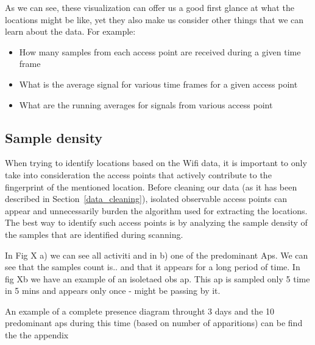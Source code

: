As we can see, these visualization can offer us a good first glance at what the
locations might be like, yet they also make us consider other things that we can
learn about the data. For example:
\begin{itemize}
  \item How many samples from each access point are received during a given time
  frame
  \item What is the average signal for various time frames for a given access
  point
  \item What are the running averages for signals from various access point
\end{itemize}

\subsection{Sample density}

When trying to identify locations based on the Wifi data, it is important to
only take into consideration the access points that actively contribute to the
fingerprint of the mentioned location. Before cleaning our data (as it has been
described in Section~\ref{data_cleaning}), isolated observable access points can
appear and unnecessarily burden the algorithm used for extracting the locations.
The best way to identify such access points is by analyzing the sample density
of the samples that are identified during scanning.

In Fig X a) we can see all activiti and in b) one of the predominant Aps. We can
see that the samples count is.. and that it appears for a long period of time.
In fig Xb we have an example of an isoletaed obs ap. This ap is sampled only 5
time in 5 mins and appears only once - might be passing by it.

An example of a complete presence diagram throught 3 days and the 10 predominant
aps during this time (based on number of apparitions) can be find the the
appendix %

